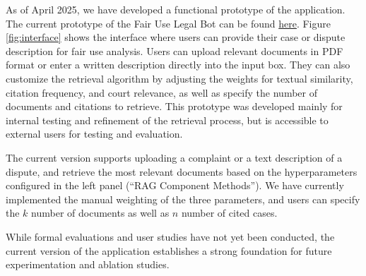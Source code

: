As of April 2025, we have developed a functional prototype of the application. The current prototype of the Fair Use Legal Bot can be found \href{https://fairuselegalbot-main.streamlit.app/}{here}. Figure \ref{fig:interface} shows the interface where users can provide their case or dispute description for fair use analysis. Users can upload relevant documents in PDF format or enter a written description directly into the input box. They can also customize the retrieval algorithm by adjusting the weights for textual similarity, citation frequency, and court relevance, as well as specify the number of documents and citations to retrieve. This prototype was developed mainly for internal testing and refinement of the retrieval process, but is accessible to external users for testing and evaluation.

The current version supports uploading a complaint or a text description of a dispute, and retrieve the most relevant documents based on the hyperparameters configured in the left panel (``RAG Component Methods”). We have currently implemented the manual weighting of the three parameters, and users can specify the $k$ number of documents as well as $n$ number of cited cases. 

While formal evaluations and user studies have not yet been conducted, the current version of the application establishes a strong foundation for future experimentation and ablation studies.
